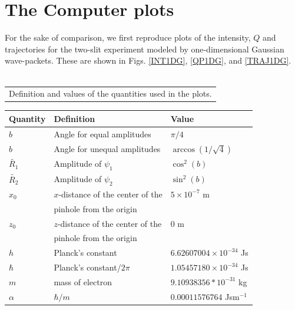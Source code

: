 \documentclass[12pt]{article}       %
\begin{document}
 \section{The Computer plots\label{COMPP}}
For the sake of comparison, we first reproduce plots of the intensity, $Q$ and trajectories for the two-slit experiment modeled by one-dimensional Gaussian wave-packets. These are shown in Figs. \ref{INT1DG},  \ref{QP1DG}, and  \ref{TRAJ1DG}. \\ \mbox{}\\
\begin{center}
\begin{tabular}{|l|} \hline 
\hspace*{.1in}{\bf Table \ref{COMPP}.1}   Definition and values of the quantities used in the plots. \hspace*{0.4cm}\\ 
\end{tabular}
\begin{tabular}{|l|l|l|} \hline\hline 
\textbf{Quantity}&\hspace*{.8in}\textbf{Definition}                &  \textbf{Value}   \\   \hline\hline  
$b$                     & Angle for equal amplitudes  &  $\pi/4$\\ \hline
$b$                     & Angle for unequal amplitudes  &  $\arccos(1/\sqrt{4})$ \\ \hline
$\tilde{R_1}$&   Amplitude   of $\psi_1$                    &$\cos^2 (b)$ \\  \hline
$\tilde{R_2}$&   Amplitude   of $\psi_2$                       &$\sin^2 (b)$\\ \hline
$x_0$ & $x$-distance of the center of the&   $5\times 10^{-7}$ m\\ 
                     &   pinhole from the origin        &  \\ \hline
$z_0$ & $z$-distance of the center of the&  $0$  m \\ 
                     &   pinhole from the origin        &  \\ \hline
$h$             &   Planck's constant                   &   $6.62607004\times10^{-34}$  Js     \\    \hline
$\hbar$     &   Planck's constant/$2\pi$    &   $1.05457180\times10^{-34}$  Js \\ \hline
$m$ &         mass of electron                    &   $9.10938356*10^{-31}$     kg                    \\    \hline
$\alpha$ &          $\hbar/m$                     &   $0.00011576764$     Jsm$^{-1}$                    \\    \hline

\end{tabular}
\end{center}
\end{document}
